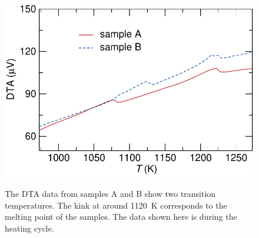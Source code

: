 \documentclass[10pt,doublespacing,edeposit]{uiucthesis2020}
\begin{document}
\begin{mainmatter}
\begin{figure}
\centering\includegraphics[width=0.7\columnwidth]{figures/ch7/DTA_plots_cropped.pdf} \\
\caption{\label{fig:DTA}
The DTA data from samples A and B show two transition temperatures. The kink at around 1120~K corresponds to the melting point of the samples. The data shown here is during the heating cycle. %
} 
\end{figure}


\end{mainmatter}
\end{document}
